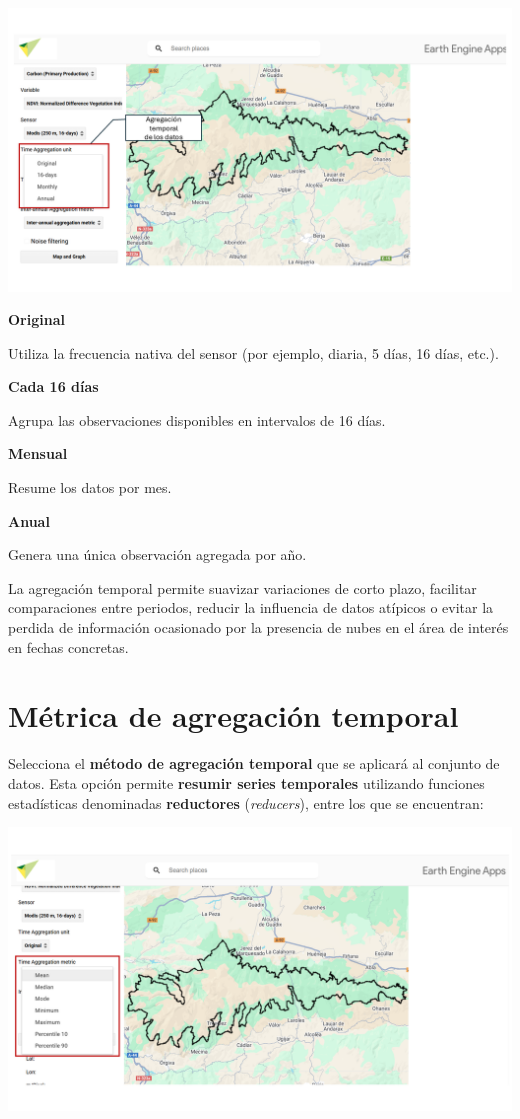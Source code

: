 \documentclass[
]{book}
\begin{document}
\includegraphics{assets/aggregation_es.png}

\textbf{Original}

Utiliza la frecuencia nativa del sensor (por ejemplo, diaria, 5 días, 16 días, etc.).

\textbf{Cada 16 días}

Agrupa las observaciones disponibles en intervalos de 16 días.

\textbf{Mensual}

Resume los datos por mes.

\textbf{Anual}

Genera una única observación agregada por año.

La agregación temporal permite suavizar variaciones de corto plazo, facilitar
comparaciones entre periodos, reducir la influencia de datos atípicos o evitar la
perdida de información ocasionado por la presencia de nubes en el área de interés en
fechas concretas.

\chapter{Métrica de agregación temporal}\label{agregacion-temporal}

Selecciona el \textbf{método de agregación temporal} que se aplicará al conjunto de datos. Esta opción permite \textbf{resumir series temporales} utilizando funciones estadísticas denominadas \textbf{reductores} (\emph{reducers}), entre los que se encuentran:

\includegraphics{assets/aggregationTime.png}
\end{document}
